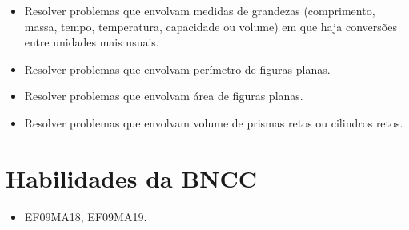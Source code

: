 \begin{escolha}
\begin{boxmedio}
\begin{boxmedio}
{\begin{boxpeq}
\begin{boxpeq}
{\begin{boxpeq}
\begin{boxmedio}
\begin{boxmedio}
\begin{boxpeq}
\begin{boxmedio}
\begin{boxpeq}
\begin{boxpeq}
\begin{boxpeq}
\begin{boxpeq}
\begin{boxmedio}
{\begin{boxmedio}
\begin{boxmedio}
\begin{boxpeq}
\begin{boxmedio}
\begin{boxpeq}
\begin{boxpeq}
\begin{boxpeq}
\begin{escolha}
{\begin{boxmedio}
\begin{boxpeq}
\begin{boxpeq}
\begin{boxpeq}
\begin{boxpeq}
\begin{boxpeq}
\begin{boxmedio}
\begin{boxpeq}
\begin{boxpeq}
\begin{boxpeq}
{\begin{boxpeq}
\begin{boxmedio}
\begin{boxpeq}
\begin{boxpeq}
\begin{boxpeq}
{\begin{boxpeq}
\begin{boxmedio}
{\begin{boxpeq}
\begin{boxpeq}
\begin{boxmedio}
\begin{boxmedio}
\begin{boxpeq}
\begin{boxpeq}
{\begin{boxpeq}
\begin{boxpeq}
\begin{boxpeq}
\begin{boxpeq}
\begin{boxpeq}
\begin{escolha}
\begin{escolha}
{\begin{boxmedio}
\begin{boxpeq}
\begin{q°}
\begin{boxmedio}
\begin{boxpeq}
\begin{boxpeq}
\begin{boxmedio}
\begin{boxmedio}
\begin{boxmedio}
\begin{boxmedio}
\begin{itemize}
  \item Resolver problemas que envolvam medidas de grandezas (comprimento,
massa, tempo, temperatura, capacidade ou volume) em que haja
conversões entre unidades mais usuais. 
  \item Resolver problemas que envolvam perímetro de figuras planas. 
  \item Resolver problemas que envolvam área de figuras planas. 
  \item Resolver problemas que envolvam volume de prismas retos ou cilindros
retos.  

\end{itemize} 

\section{Habilidades da BNCC}

\begin{itemize}
  \item EF09MA18, EF09MA19. 
\end{itemize}

\end{boxmedio}
\end{boxmedio}
\end{boxmedio}
\end{boxmedio}
\end{boxpeq}
\end{boxpeq}
\end{boxmedio}
\end{q°}
\end{boxpeq}
\end{boxmedio}}
\end{escolha}
\end{escolha}
\end{boxpeq}
\end{boxpeq}
\end{boxpeq}
\end{boxpeq}
\end{boxpeq}}
\end{boxpeq}
\end{boxpeq}
\end{boxmedio}
\end{boxmedio}
\end{boxpeq}
\end{boxpeq}}
\end{boxmedio}
\end{boxpeq}}
\end{boxpeq}
\end{boxpeq}
\end{boxpeq}
\end{boxmedio}
\end{boxpeq}}
\end{boxpeq}
\end{boxpeq}
\end{boxpeq}
\end{boxmedio}
\end{boxpeq}
\end{boxpeq}
\end{boxpeq}
\end{boxpeq}
\end{boxpeq}
\end{boxmedio}}
\end{escolha}
\end{boxpeq}
\end{boxpeq}
\end{boxpeq}
\end{boxmedio}
\end{boxpeq}
\end{boxmedio}
\end{boxmedio}}
\end{boxmedio}
\end{boxpeq}
\end{boxpeq}
\end{boxpeq}
\end{boxpeq}
\end{boxmedio}
\end{boxpeq}
\end{boxmedio}
\end{boxmedio}
\end{boxpeq}}
\end{boxpeq}
\end{boxpeq}}
\end{boxmedio}
\end{boxmedio}
\end{escolha}

